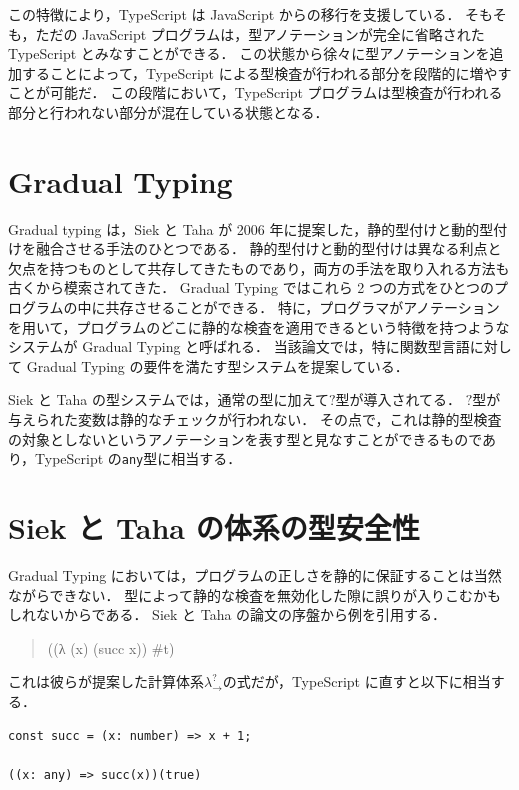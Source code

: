 この特徴により，TypeScript は JavaScript からの移行を支援している．
そもそも，ただの JavaScript プログラムは，型アノテーションが完全に省略された TypeScript とみなすことができる．
この状態から徐々に型アノテーションを追加することによって，TypeScript による型検査が行われる部分を段階的に増やすことが可能だ．
この段階において，TypeScript プログラムは型検査が行われる部分と行われない部分が混在している状態となる．

\section{Gradual Typing}

Gradual typing \cite{GradualTyping}は，Siek と Taha が 2006 年に提案した，静的型付けと動的型付けを融合させる手法のひとつである．
静的型付けと動的型付けは異なる利点と欠点を持つものとして共存してきたものであり，両方の手法を取り入れる方法も古くから模索されてきた．
Gradual Typing ではこれら 2 つの方式をひとつのプログラムの中に共存させることができる．
特に，プログラマがアノテーションを用いて，プログラムのどこに静的な検査を適用できるという特徴を持つようなシステムが Gradual Typing と呼ばれる．
当該論文では，特に関数型言語に対して Gradual Typing の要件を満たす型システムを提案している．

Siek と Taha の型システムでは，通常の型に加えて$?$型が導入されてる．
$?$型が与えられた変数は静的なチェックが行われない．
その点で，これは静的型検査の対象としないというアノテーションを表す型と見なすことができるものであり，TypeScript の\texttt{any}型に相当する．

\section{Siek と Taha の体系の型安全性}
\label{sec:safety_of_siek_taha}

Gradual Typing においては，プログラムの正しさを静的に保証することは当然ながらできない．
型によって静的な検査を無効化した隙に誤りが入りこむかもしれないからである．
Siek と Taha の論文の序盤から例を引用する．

\begin{quote}
    ((λ (x) (succ x)) \#t)
\end{quote}

これは彼らが提案した計算体系$\lambda^?_\to$の式だが，TypeScript に直すと以下に相当する．

\begin{lstlisting}[caption={TypeScript における例}, label={lst:example_ts}]
const succ = (x: number) => x + 1;

((x: any) => succ(x))(true)
\end{lstlisting}

